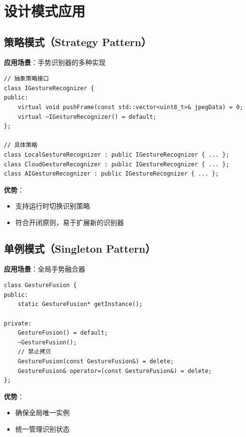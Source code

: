 \documentclass{article}
\begin{document}
\newpage

\section{设计模式应用}

\subsection{策略模式（Strategy Pattern）}

\textbf{应用场景}：手势识别器的多种实现

\begin{lstlisting}[caption=策略模式实现]
// 抽象策略接口
class IGestureRecognizer {
public:
    virtual void pushFrame(const std::vector<uint8_t>& jpegData) = 0;
    virtual ~IGestureRecognizer() = default;
};

// 具体策略
class LocalGestureRecognizer : public IGestureRecognizer { ... };
class CloudGestureRecognizer : public IGestureRecognizer { ... };
class AIGestureRecognizer : public IGestureRecognizer { ... };
\end{lstlisting}

\textbf{优势}：
\begin{itemize}[leftmargin=*]
    \item 支持运行时切换识别策略
    \item 符合开闭原则，易于扩展新的识别器
\end{itemize}

\subsection{单例模式（Singleton Pattern）}

\textbf{应用场景}：全局手势融合器

\begin{lstlisting}[caption=单例模式实现]
class GestureFusion {
public:
    static GestureFusion* getInstance();
    
private:
    GestureFusion() = default;
    ~GestureFusion();
    // 禁止拷贝
    GestureFusion(const GestureFusion&) = delete;
    GestureFusion& operator=(const GestureFusion&) = delete;
};
\end{lstlisting}

\textbf{优势}：
\begin{itemize}[leftmargin=*]
    \item 确保全局唯一实例
    \item 统一管理识别状态
\end{itemize}
\end{document}

